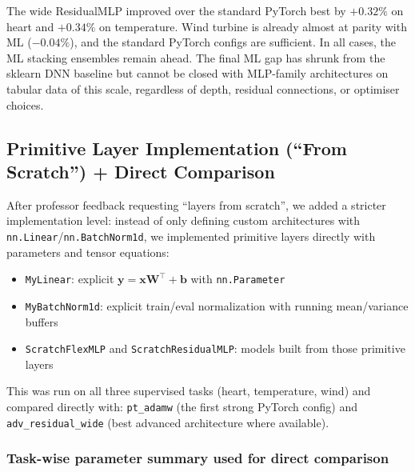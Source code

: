 \documentclass[11pt,a4paper]{article}
\begin{document}
The wide ResidualMLP improved over the standard PyTorch best by $+0.32\%$ on heart and $+0.34\%$ on temperature.
Wind turbine is already almost at parity with ML ($-0.04\%$), and the standard PyTorch configs are sufficient.
In all cases, the ML stacking ensembles remain ahead. The final ML gap has shrunk from the sklearn DNN baseline
but cannot be closed with MLP-family architectures on tabular data of this scale, regardless of depth,
residual connections, or optimiser choices.

\subsection{Primitive Layer Implementation (``From Scratch'') + Direct Comparison}

After professor feedback requesting ``layers from scratch'', we added a stricter implementation level:
instead of only defining custom architectures with \texttt{nn.Linear}/\texttt{nn.BatchNorm1d}, we implemented primitive layers directly with parameters and tensor equations:

\begin{itemize}[leftmargin=1.2em,itemsep=0.15em]
    \item \texttt{MyLinear}: explicit $\mathbf{y}=\mathbf{x}\mathbf{W}^\top+\mathbf{b}$ with \texttt{nn.Parameter}
    \item \texttt{MyBatchNorm1d}: explicit train/eval normalization with running mean/variance buffers
    \item \texttt{ScratchFlexMLP} and \texttt{ScratchResidualMLP}: models built from those primitive layers
\end{itemize}

This was run on all three supervised tasks (heart, temperature, wind) and compared directly with:
\texttt{pt\_adamw} (the first strong PyTorch config) and \texttt{adv\_residual\_wide} (best advanced architecture where available).

\subsubsection*{Task-wise parameter summary used for direct comparison}
\end{document}

